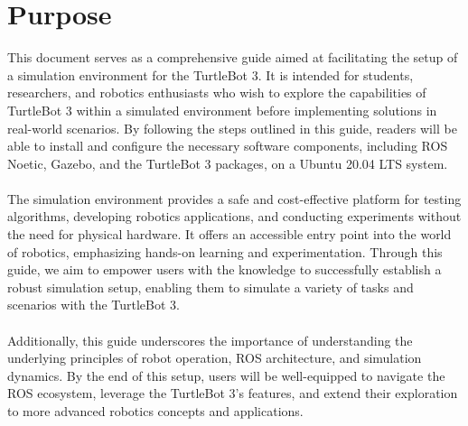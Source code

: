 \documentclass[12pt,a4paper]{article}
\begin{document}
	

	\clearpage
	\section{Purpose}
	This document serves as a comprehensive guide aimed at facilitating the setup of a simulation environment for the TurtleBot 3. It is intended for students, researchers, and robotics enthusiasts who wish to explore the capabilities of TurtleBot 3 within a simulated environment before implementing solutions in real-world scenarios. By following the steps outlined in this guide, readers will be able to install and configure the necessary software components, including ROS Noetic, Gazebo, and the TurtleBot 3 packages, on a Ubuntu 20.04 LTS system.
	\\\\
	The simulation environment provides a safe and cost-effective platform for testing algorithms, developing robotics applications, and conducting experiments without the need for physical hardware. It offers an accessible entry point into the world of robotics, emphasizing hands-on learning and experimentation. Through this guide, we aim to empower users with the knowledge to successfully establish a robust simulation setup, enabling them to simulate a variety of tasks and scenarios with the TurtleBot 3.
	\\\\
	Additionally, this guide underscores the importance of understanding the underlying principles of robot operation, ROS architecture, and simulation dynamics. By the end of this setup, users will be well-equipped to navigate the ROS ecosystem, leverage the TurtleBot 3's features, and extend their exploration to more advanced robotics concepts and applications.
	
\end{document}
